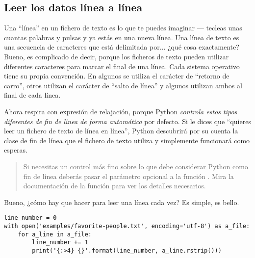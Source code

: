 \subsection{Leer los datos línea a línea}

Una ``línea'' en un fichero de texto es lo que te puedes imaginar --- tecleas unas cuantas palabras y pulsas  y ya estás en una nueva línea. Una línea de texto es una secuencia de caracteres que está delimitada por... ¿qué cosa exactamente? Bueno, es complicado de decir, porque los ficheros de texto pueden utilizar diferentes caracteres para marcar el final de una línea. Cada sistema operativo tiene su propia convención. En algunos se utiliza el carácter de ``retorno de carro'', otros utilizan el carácter de ``salto de línea'' y algunos utilizan ambos al final de cada línea.

Ahora respira con expresión de relajación, porque Python \emph{controla estos tipos diferentes de fin de línea  de forma automática} por defecto. Si le dices que ``quieres leer un fichero de texto de línea en línea'', Python descubrirá por su cuenta la clase de fin de línea que el fichero de texto utiliza y simplemente funcionará como esperas.

\begin{quote}
Si necesitas un control más fino sobre lo que debe considerar Python como fin de línea deberás pasar el parámetro opcional  a la función . Mira la documentación de la función \href{http://docs.python.org/3.1/library/io.html#module-interface}{} para ver los detalles necesarios.
\end{quote}

Bueno, ¿cómo hay que hacer para leer una línea cada vez? Es simple, es bello.

\noindent\begin{minipage}{\textwidth}
\begin{lstlisting}[mathescape=True]
line_number = 0
with open('examples/favorite-people.txt', encoding='utf-8') as a_file:
    for a_line in a_file:
        line_number += 1
        print('{:>4} {}'.format(line_number, a_line.rstrip()))
\end{lstlisting}
\end{minipage}

